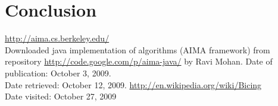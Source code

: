 \documentclass[11pt,twoside,a4paper]{mr}%
\begin{document}
\chapter{Conclusion}

\clearpage
\begin{thebibliography}{9}
		\url{http://aima.cs.berkeley.edu/} \\
		{Downloaded java implementation of algorithms (AIMA framework) from repository \url{http://code.google.com/p/aima-java/} by Ravi Mohan. Date of publication: October 3, 2009. \\
		Date retrieved: October 12, 2009. }
\url{http://en.wikipedia.org/wiki/Bicing}\\
{Date visited: October 27, 2009}


\end{thebibliography}
\end{document}

